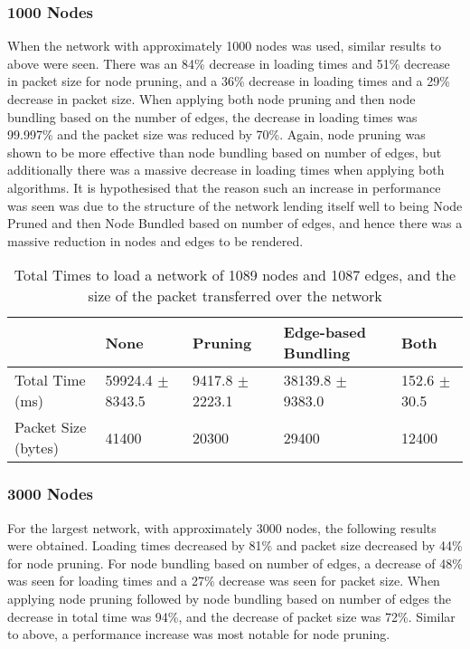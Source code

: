 \documentclass[../dissertation.tex]{subfiles}
\begin{document}
\subsubsection{1000 Nodes}

When the network with approximately 1000 nodes was used, similar results to above were seen. There was an 84\% decrease in loading times and 51\% decrease in packet size for node pruning, and a 36\% decrease in loading times and a 29\% decrease in packet size. When applying both node pruning and then node bundling based on the number of edges, the decrease in loading times was 99.997\% and the packet size was reduced by 70\%. Again, node pruning was shown to be more effective than node bundling based on number of edges, but additionally there was a massive decrease in loading times when applying both algorithms. It is hypothesised that the reason such an increase in performance was seen was due to the structure of the network lending itself well to being Node Pruned and then Node Bundled based on number of edges, and hence there was a massive reduction in nodes and edges to be rendered.

\begin{table}[H]
\centering
\begin{tabular}{|l|l|l|l|l|}
\hline
                    & \textbf{None}        & \textbf{Pruning}    & \textbf{Edge-based Bundling}        & \textbf{Both}    \\ \hline
Total Time (ms)     & 59924.4 $\pm$ 8343.5 & 9417.8 $\pm$ 2223.1 & 38139.8 $\pm$ 9383.0 & 152.6 $\pm$ 30.5 \\ \hline
Packet Size (bytes) & 41400                & 20300               & 29400                & 12400            \\ \hline
\end{tabular}
\caption{Total Times to load a network of 1089 nodes and 1087 edges, and the size of the packet transferred over the network}
\label{table:1000-nodes}
\end{table}

\subsubsection{3000 Nodes}

For the largest network, with approximately 3000 nodes, the following results were obtained. Loading times decreased by 81\% and packet size decreased by 44\% for node pruning. For node bundling based on number of edges, a decrease of 48\% was seen for loading times and a 27\% decrease was seen for packet size. When applying node pruning followed by node bundling based on number of edges the decrease in total time was 94\%, and the decrease of packet size was 72\%. Similar to above, a performance increase was most notable for node pruning. 
\end{document}
